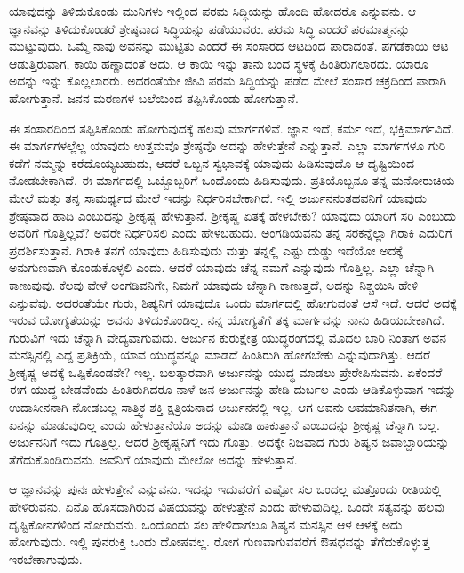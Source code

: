ಯಾವುದನ್ನು ತಿಳಿದುಕೊಂಡು ಮುನಿಗಳು ಇಲ್ಲಿಂದ ಪರಮ ಸಿದ್ಧಿಯನ್ನು ಹೊಂದಿ ಹೋದರೊ ಎನ್ನುವನು. ಆ ಜ್ಞಾನವನ್ನು ತಿಳಿದುಕೊಂಡರೆ ಶ್ರೇಷ್ಠವಾದ ಸಿದ್ಧಿಯನ್ನು ಪಡೆಯುವರು. ಪರಮ ಸಿದ್ಧಿ ಎಂದರೆ ಪರಮಾತ್ಮನನ್ನು ಮುಟ್ಟುವುದು. ಒಮ್ಮೆ ನಾವು ಅವನನ್ನು ಮುಟ್ಟಿತು ಎಂದರೆ ಈ ಸಂಸಾರದ ಆಟದಿಂದ ಪಾರಾದಂತೆ. ಪಗಡೆಕಾಯಿ ಆಟ ಆಡುತ್ತಿರುವಾಗ, ಕಾಯಿ ಹಣ್ಣಾದಂತೆ ಅದು. ಆ ಕಾಯಿ ಇನ್ನು ತಾನು ಬಂದ ಸ್ಥಳಕ್ಕೆ ಹಿಂತಿರುಗಲಾರದು. ಯಾರೂ ಅದನ್ನು ಇನ್ನು ಕೊಲ್ಲಲಾರರು. ಅದರಂತೆಯೇ ಜೀವಿ ಪರಮ ಸಿದ್ಧಿಯನ್ನು ಪಡೆದ ಮೇಲೆ ಸಂಸಾರ ಚಕ್ರದಿಂದ ಪಾರಾಗಿ ಹೋಗುತ್ತಾನೆ. ಜನನ ಮರಣಗಳ ಬಲೆಯಿಂದ ತಪ್ಪಿಸಿಕೊಂಡು ಹೋಗುತ್ತಾನೆ.

ಈ ಸಂಸಾರದಿಂದ ತಪ್ಪಿಸಿಕೊಂಡು ಹೋಗುವುದಕ್ಕೆ ಹಲವು ಮಾರ್ಗಗಳಿವೆ. ಜ್ಞಾನ ಇದೆ, ಕರ್ಮ ಇದೆ, ಭಕ್ತಿಮಾರ್ಗವಿದೆ. ಈ ಮಾರ್ಗಗಳಲ್ಲೆಲ್ಲ ಯಾವುದು ಉತ್ತಮವೊ ಶ್ರೇಷ್ಠವೊ ಅದನ್ನು ಹೇಳುತ್ತೇನೆ ಎನ್ನುತ್ತಾನೆ. ಎಲ್ಲಾ ಮಾರ್ಗಗಳೂ ಗುರಿ ಕಡೆಗೆ ನಮ್ಮನ್ನು ಕರೆದೊಯ್ಯಬಹುದು, ಆದರೆ ಒಬ್ಬನ ಸ್ವಭಾವಕ್ಕೆ ಯಾವುದು ಹಿಡಿಸುವುದೊ ಆ ದೃಷ್ಟಿಯಿಂದ ನೋಡಬೇಕಾಗಿದೆ. ಈ ಮಾರ್ಗದಲ್ಲಿ ಒಬ್ಬೊಬ್ಬರಿಗೆ ಒಂದೊಂದು ಹಿಡಿಸುವುದು. ಪ್ರತಿಯೊಬ್ಬನೂ ತನ್ನ ಮನೋರುಚಿಯ ಮೇಲೆ ಮತ್ತು ತನ್ನ ಸಾಮರ್ಥ್ಯದ ಮೇಲೆ ಇದನ್ನು ನಿರ್ಧರಿಸಬೇಕಾಗಿದೆ. ಇಲ್ಲಿ ಅರ್ಜುನನಂತಹವನಿಗೆ ಯಾವುದು ಶ್ರೇಷ್ಠವಾದ ಹಾದಿ ಎಂಬುದನ್ನು ಶ‍್ರೀಕೃಷ್ಣ ಹೇಳುತ್ತಾನೆ. ಶ‍್ರೀಕೃಷ್ಣ ಏತಕ್ಕೆ ಹೇಳಬೇಕು? ಯಾವುದು ಯಾರಿಗೆ ಸರಿ ಎಂಬುದು ಅವರಿಗೆ ಗೊತ್ತಿಲ್ಲವೆ? ಅವರೇ ನಿರ್ಧರಿಸಲಿ ಎಂದು ಹೇಳಬಹುದು. ಅಂಗಡಿಯವನು ತನ್ನ ಸರಕನ್ನೆಲ್ಲಾ ಗಿರಾಕಿ ಎದುರಿಗೆ ಪ್ರದರ್ಶಿಸುತ್ತಾನೆ. ಗಿರಾಕಿ ತನಗೆ ಯಾವುದು ಹಿಡಿಸುವುದು ಮತ್ತು ತನ್ನಲ್ಲಿ ಎಷ್ಟು ದುಡ್ಡು ಇದೆಯೋ ಅದಕ್ಕೆ ಅನುಗುಣವಾಗಿ ಕೊಂಡುಕೊಳ್ಳಲಿ ಎಂದು. ಆದರೆ ಯಾವುದು ಚೆನ್ನ ನಮಗೆ ಎನ್ನುವುದು ಗೊತ್ತಿಲ್ಲ. ಎಲ್ಲಾ ಚೆನ್ನಾಗಿ ಕಾಣುವುವು. ಕೆಲವು ವೇಳೆ ಅಂಗಡಿವನಿಗೇ, ನಿಮಗೆ ಯಾವುದು ಚೆನ್ನಾಗಿ ಕಾಣುತ್ತದೆ, ಅದನ್ನು ನಿಶ್ಚಯಿಸಿ ಹೇಳಿ ಎನ್ನುವೆವು. ಅದರಂತೆಯೇ ಗುರು, ಶಿಷ್ಯನಿಗೆ ಯಾವುದೊ ಒಂದು ಮಾರ್ಗದಲ್ಲಿ ಹೋಗುವಂತೆ ಆಸೆ ಇದೆ. ಆದರೆ ಅದಕ್ಕೆ ಇರುವ ಯೋಗ್ಯತೆಯನ್ನು ಅವನು ತಿಳಿದುಕೊಂಡಿಲ್ಲ. ನನ್ನ ಯೋಗ್ಯತೆಗೆ ತಕ್ಕ ಮಾರ್ಗವನ್ನು ನಾನು ಹಿಡಿಯಬೇಕಾಗಿದೆ. ಗುರುವಿಗೆ ಇದು ಚೆನ್ನಾಗಿ ವೇದ್ಯವಾಗುವುದು. ಅರ್ಜುನ ಕುರುಕ್ಷೇತ್ರ ಯುದ್ಧರಂಗದಲ್ಲಿ ಮೊದಲ ಬಾರಿ ನಿಂತಾಗ ಅವನ ಮನಸ್ಸಿನಲ್ಲಿ ಎದ್ದ ಪ್ರತಿಕ್ರಿಯೆ, ಯಾವ ಯುದ್ಧವನ್ನೂ ಮಾಡದೆ ಹಿಂತಿರುಗಿ ಹೋಗಬೇಕು ಎನ್ನುವುದಾಗಿತ್ತು. ಆದರೆ ಶ‍್ರೀಕೃಷ್ಣ ಅದಕ್ಕೆ ಒಪ್ಪಿಕೊಂಡನೇ? ಇಲ್ಲ. ಬಲತ್ಕಾರವಾಗಿ ಅರ್ಜುನನ್ನು ಯುದ್ಧ ಮಾಡಲು ಪ್ರೇರೇಪಿಸುವನು. ಏಕೆಂದರೆ ಈಗ ಯುದ್ಧ ಬೇಡವೆಂದು ಹಿಂತಿರುಗಿದರೂ ನಾಳೆ ಜನ ಅರ್ಜುನನ್ನು ಹೇಡಿ ದುರ್ಬಲ ಎಂದು ಆಡಿಕೊಳ್ಳುವಾಗ ಇದನ್ನು ಉದಾಸೀನನಾಗಿ ನೋಡಬಲ್ಲ ಸಾತ್ತ್ವಿಕ ಶಕ್ತಿ ಕ್ಷತ್ರಿಯನಾದ ಅರ್ಜುನನಲ್ಲಿ ಇಲ್ಲ. ಆಗ ಅವನು ಅವಮಾನಿತನಾಗಿ, ಈಗ ಏನನ್ನು ಮಾಡುವುದಿಲ್ಲ ಎಂದು ಹೇಳುತ್ತಾನೆಯೊ ಅದನ್ನು ಮಾಡಿ ಹಾಕುತ್ತಾನೆ ಎಂಬುದನ್ನು ಶ‍್ರೀಕೃಷ್ಣ ಚೆನ್ನಾಗಿ ಬಲ್ಲ. ಅರ್ಜುನನಿಗೆ ಇದು ಗೊತ್ತಿಲ್ಲ. ಆದರೆ ಶ‍್ರೀಕೃಷ್ಣನಿಗೆ ಇದು ಗೊತ್ತು. ಅದಕ್ಕೇ ನಿಜವಾದ ಗುರು ಶಿಷ್ಯನ ಜವಾಬ್ದಾರಿಯನ್ನು ತೆಗೆದುಕೊಂಡಿರುವನು. ಅವನಿಗೆ ಯಾವುದು ಮೇಲೋ ಅದನ್ನು ಹೇಳುತ್ತಾನೆ.

ಆ ಜ್ಞಾನವನ್ನು ಪುನಃ ಹೇಳುತ್ತೇನೆ ಎನ್ನುವನು. ಇದನ್ನು ಇದುವರೆಗೆ ಎಷ್ಟೋ ಸಲ ಒಂದಲ್ಲ ಮತ್ತೊಂದು ರೀತಿಯಲ್ಲಿ ಹೇಳಿರುವನು. ಏನೊ ಹೊಸದಾಗಿರುವ ವಿಷಯವನ್ನು ಹೇಳುತ್ತೇನೆ ಎಂದು ಹೇಳುವುದಿಲ್ಲ. ಒಂದೇ ಸತ್ಯವನ್ನು ಹಲವು ದೃಷ್ಟಿಕೋನಗಳಿಂದ ನೋಡುವನು. ಒಂದೊಂದು ಸಲ ಹೇಳಿದಾಗಲೂ ಶಿಷ್ಯನ ಮನಸ್ಸಿನ ಆಳ ಆಳಕ್ಕೆ ಅದು ಹೋಗುವುದು. ಇಲ್ಲಿ ಪುನರುಕ್ತಿ ಒಂದು ದೋಷವಲ್ಲ. ರೋಗ ಗುಣವಾಗುವವರೆಗೆ ಔಷಧವನ್ನು ತೆಗೆದುಕೊಳ್ಳುತ್ತ ಇರಬೇಕಾಗುವುದು.

